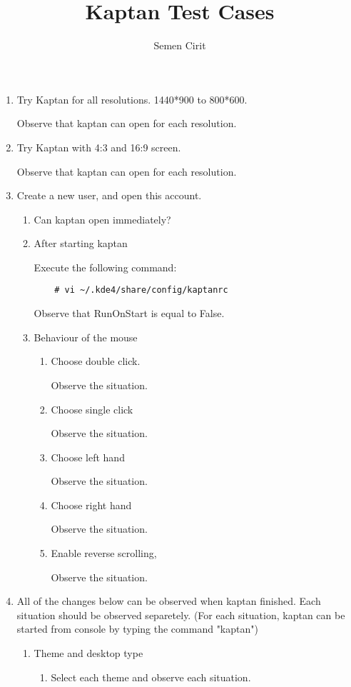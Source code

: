 \documentclass[a4paper,10pt]{article}
\title{Kaptan Test Cases}
\author{Semen Cirit}
\begin{document}
\maketitle

\begin{enumerate}

\item Try Kaptan for all resolutions. 1440*900 to 800*600.

Observe that kaptan can open for each resolution.

\item Try Kaptan with 4:3 and 16:9 screen.

Observe that kaptan can open for each resolution.

\item Create a new user, and open this account.
\begin{enumerate}
    \item Can kaptan open immediately?

    \item After starting kaptan

          Execute the following command:
\begin{verbatim}
    # vi ~/.kde4/share/config/kaptanrc
\end{verbatim} 
        Observe that RunOnStart is equal to False.

    \item Behaviour of the mouse
    \begin{enumerate}
        \item Choose double click.

            Observe the situation.
        \item Choose single click

            Observe the situation.

        \item Choose left hand

            Observe the situation.
        \item Choose right hand

            Observe the situation.

        \item Enable reverse scrolling,

            Observe the situation.
    \end{enumerate}
\end{enumerate}

\item All of the changes below can be observed when kaptan finished. Each situation should be observed separetely.
(For each situation, kaptan can be started from console by typing the command "kaptan")
    \begin{enumerate}
    \item Theme and desktop type
        \begin{enumerate}
        \item Select each theme and observe each situation.


\end{enumerate}
\end{enumerate}
\end{enumerate}
\end{document}
